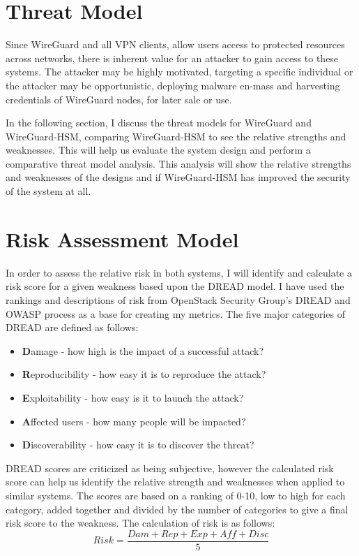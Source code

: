 \documentclass [11pt, proquest] {uwthesis}[2020/02/24]
\begin{document}
\section{Threat Model}
Since WireGuard and all VPN clients, allow users access to protected resources across networks, there is inherent value for an attacker to gain access to these systems.
The attacker may be highly motivated, targeting a specific individual or the attacker may be opportunistic, deploying malware en-mass and harvesting credentials of WireGuard nodes, for later sale or use.


In the following section, I discuss the threat models for WireGuard and WireGuard-HSM, comparing WireGuard-HSM to see the relative strengths and weaknesses. This will help us evaluate the system design and perform a comparative threat model analysis. This analysis will show the relative strengths and weaknesses of the designs and if WireGuard-HSM has improved the security of the system at all.

\section{Risk Assessment Model}
In order to assess the relative risk in both systems, I will identify and calculate a risk score for a given weakness based upon the DREAD model. I have used the rankings and descriptions of risk from OpenStack Security Group's DREAD and OWASP process \cite{openstack_securityossa-metrics_2022}\cite{owasp_threat_2022} as a base for creating my metrics. The five major categories of DREAD are defined as follows:

\begin{itemize}
  \item \textbf{D}amage - how high is the impact of a successful attack?
  \item \textbf{R}eproducibility - how easy it is to reproduce the attack? 
  \item \textbf{E}xploitability - how easy is it to launch the attack?
  \item \textbf{A}ffected users - how many people will be impacted?
  \item \textbf{D}iscoverability - how easy it is to discover the threat?
\end{itemize}
\bigskip

\label{dread}
DREAD scores are criticized as being subjective, however the calculated risk score can help us identify the relative strength and weaknesses when applied to similar systems. The scores are based on a ranking of 0-10, low to high for each category, added together and divided by the number of categories to give a final risk score to the weakness. 
The calculation of risk is as follows:
\begin{equation}
Risk = \frac{Dam + Rep + Exp + Aff + Disc }{5}
\end{equation}
\end{document}
